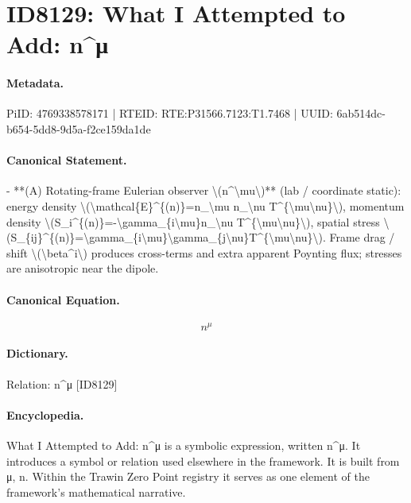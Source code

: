 \section*{ID8129: What I Attempted to Add: n\textasciicircum{}μ}
\paragraph{Metadata.}
PiID: 4769338578171 | RTEID: RTE:P31566.7123:T1.7468 | UUID: 6ab514dc-b654-5dd8-9d5a-f2ce159da1de

\paragraph{Canonical Statement.}
- **(A) Rotating-frame Eulerian observer \textbackslash{}(n\textasciicircum{}\textbackslash{}mu\textbackslash{})** (lab / coordinate static): energy density \textbackslash{}(\textbackslash{}mathcal\{E\}\textasciicircum{}\{(n)\}=n\_\textbackslash{}mu n\_\textbackslash{}nu T\textasciicircum{}\{\textbackslash{}mu\textbackslash{}nu\}\textbackslash{}), momentum density \textbackslash{}(S\_i\textasciicircum{}\{(n)\}=-\textbackslash{}gamma\_\{i\textbackslash{}mu\}n\_\textbackslash{}nu T\textasciicircum{}\{\textbackslash{}mu\textbackslash{}nu\}\textbackslash{}), spatial stress \textbackslash{}(S\_\{ij\}\textasciicircum{}\{(n)\}=\textbackslash{}gamma\_\{i\textbackslash{}mu\}\textbackslash{}gamma\_\{j\textbackslash{}nu\}T\textasciicircum{}\{\textbackslash{}mu\textbackslash{}nu\}\textbackslash{}). Frame drag / shift \textbackslash{}(\textbackslash{}beta\textasciicircum{}i\textbackslash{}) produces cross-terms and extra apparent Poynting flux; stresses are anisotropic near the dipole.

\paragraph{Canonical Equation.}
\[
n^\mu
\]

\paragraph{Dictionary.}
Relation: n\textasciicircum{}μ [ID8129]

\paragraph{Encyclopedia.}
What I Attempted to Add: n\textasciicircum{}μ is a symbolic expression, written n\textasciicircum{}μ. It introduces a symbol or relation used elsewhere in the framework. It is built from μ, n. Within the Trawin Zero Point registry it serves as one element of the framework's mathematical narrative.
